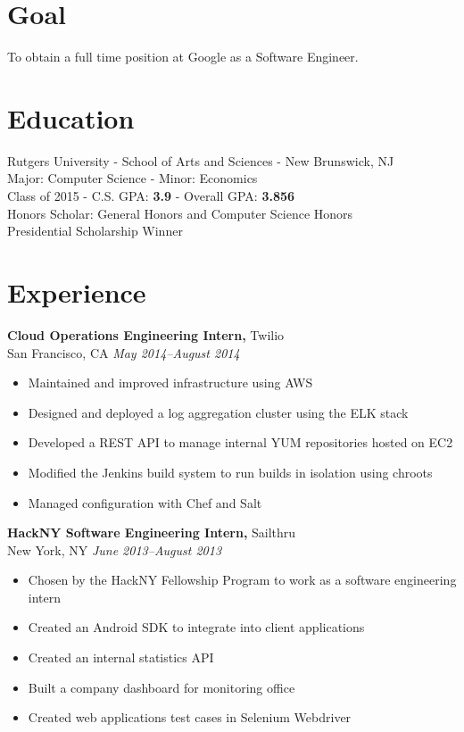 \documentclass[margin]{res}
\begin{document}
 
\begin{resume} 

\section{Goal}
To obtain a full time position at Google as a Software Engineer.
 
\section{Education} 
Rutgers University - School of Arts and Sciences - New Brunswick, NJ\\
Major: Computer Science - Minor: Economics\\
Class of 2015 - C.S. GPA: {\bf 3.9} - Overall GPA: {\bf 3.856}\\
Honors Scholar: General Honors and Computer Science Honors\\
Presidential Scholarship Winner\\

\section{Experience}

{\bf Cloud Operations Engineering Intern,} Twilio\\
San Francisco, CA \textit{May 2014--August 2014}
\begin{itemize} \itemsep -2pt
    \item Maintained and improved infrastructure using AWS
    \item Designed and deployed a log aggregation cluster using the ELK stack
    \item Developed a REST API to manage internal YUM repositories hosted on EC2
    \item Modified the Jenkins build system to run builds in isolation using
    chroots
    \item Managed configuration with Chef and Salt
\end{itemize}

{\bf HackNY Software Engineering Intern,} Sailthru\\
New York, NY \textit{June 2013--August 2013}
\begin{itemize} \itemsep -2pt
    \item Chosen by the HackNY Fellowship Program to work as a software
        engineering intern
    \item Created an Android SDK to integrate into client applications
    \item Created an internal statistics API
    \item Built a company dashboard for monitoring office
    \item Created web applications test cases in Selenium Webdriver
\end{itemize}



\end{resume}
\end{document}
